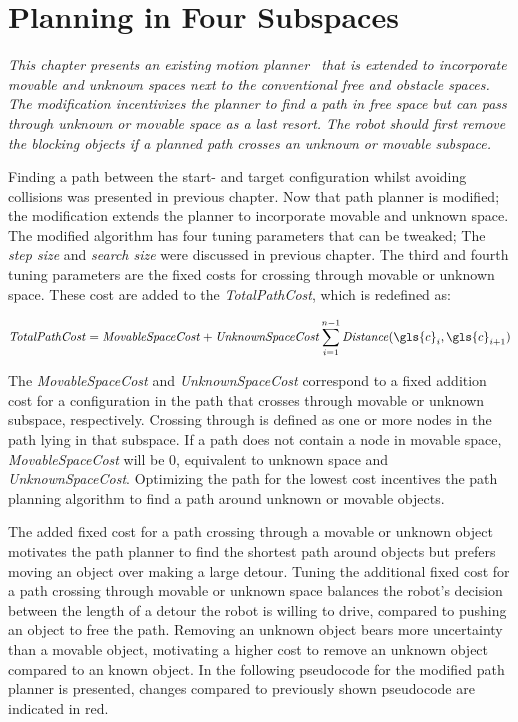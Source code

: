 \chapter{Planning in Four Subspaces}%
\label{chap:proposed_planning}
\textit{This chapter presents an existing motion planner~\cite{chen_fast_2018} that is extended to incorporate movable and unknown spaces next to the conventional free and obstacle spaces. The modification incentivizes the planner to find a path in free space but can pass through unknown or movable space as a last resort. The robot should first remove the blocking objects if a planned path crosses an unknown or movable subspace.\bs}

Finding a path between the start- and target configuration whilst avoiding collisions was presented in previous chapter. Now that path planner is modified; the modification extends the planner to incorporate movable and unknown space. The modified algorithm has four tuning parameters that can be tweaked; The \textit{step size} and \textit{search size} were discussed in previous chapter. The third and fourth tuning parameters are the fixed costs for crossing through movable or unknown space. These cost are added to the \textit{TotalPathCost}, which is redefined as:\bs

\[\mathit{TotalPathCost} = \mathit{MovableSpaceCost} + \mathit{UnknownSpaceCost}\sum_{i=1}^{n-1} \mathit{Distance}(\gls{c}_i, \gls{c}_{i+1})\]

The \textit{MovableSpaceCost} and \textit{UnknownSpaceCost} correspond to a fixed addition cost for a configuration in the path that crosses through movable or unknown subspace, respectively. Crossing through is defined as one or more nodes in the path lying in that subspace. If a path does not contain a node in movable space, \textit{MovableSpaceCost} will be 0, equivalent to unknown space and \textit{UnknownSpaceCost}. Optimizing the path for the lowest cost incentives the path planning algorithm to find a path around unknown or movable objects.\bs

The added fixed cost for a path crossing through a movable or unknown object motivates the path planner to find the shortest path around objects but prefers moving an object over making a large detour. Tuning the additional fixed cost for a path crossing through movable or unknown space balances the robot's decision between the length of a detour the robot is willing to drive, compared to pushing an object to free the path. Removing an unknown object bears more uncertainty than a movable object, motivating a higher cost to remove an unknown object compared to an known object. In the following pseudocode for the modified path planner is presented, changes compared to previously shown pseudocode are indicated in red.\bs

